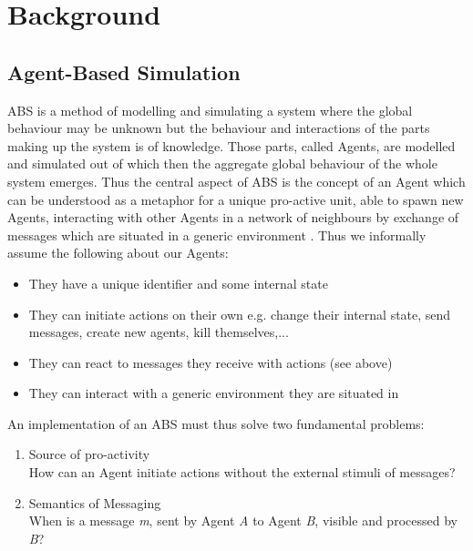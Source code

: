\section{Background}

\subsection{Agent-Based Simulation}
ABS is a method of modelling and simulating a system where the global behaviour may be unknown but the behaviour and interactions of the parts making up the system is of knowledge. Those parts, called Agents, are modelled and simulated out of which then the aggregate global behaviour of the whole system emerges. Thus the central aspect of ABS is the concept of an Agent which can be understood as a metaphor for a unique pro-active unit, able to spawn new Agents, interacting with other Agents in a network of neighbours by exchange of messages which are situated in a generic environment \cite{wooldridge_introduction_2009}. Thus we informally assume the following about our Agents:

\begin{itemize}
	\item They have a unique identifier and some internal state
	\item They can initiate actions on their own e.g. change their internal state, send messages, create new agents, kill themselves,...
	\item They can react to messages they receive with actions (see above)
	\item They can interact with a generic environment they are situated in
\end{itemize} 

An implementation of an ABS must thus solve two fundamental problems:

\begin{enumerate}
	\item Source of pro-activity \\ How can an Agent initiate actions without the external stimuli of messages?
	\item Semantics of Messaging \\ When is a message \textit{m}, sent by Agent \textit{A} to Agent \textit{B}, visible and processed by \textit{B}?
\end{enumerate}

